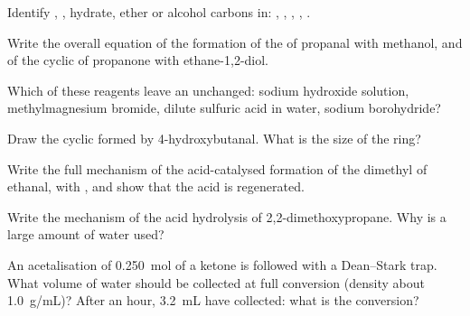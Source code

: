 \begin{exercise}[$\star$]\label{exo:b1:acetals-protection:1}
Identify , , hydrate, ether or alcohol carbons in:
, , , ,
.
\end{exercise}

\begin{exercise}[$\star$]\label{exo:b1:acetals-protection:2}
Write the overall equation of the formation of the  of propanal with
methanol, and of the cyclic  of propanone with ethane-1,2-diol.
\end{exercise}

\begin{exercise}[$\star$]\label{exo:b1:acetals-protection:3}
Which of these reagents leave an  unchanged: sodium hydroxide
solution, methylmagnesium bromide, dilute sulfuric acid in water, sodium
borohydride?
\end{exercise}

\begin{exercise}[$\star$]\label{exo:b1:acetals-protection:4}
Draw the cyclic  formed by 4-hydroxybutanal. What is the size
of the ring?
\end{exercise}

\begin{exercise}[$\star\star$]\label{exo:b1:acetals-protection:5}
Write the full mechanism of the acid-catalysed formation of the dimethyl
 of ethanal, with , and show that the acid is
regenerated.
\end{exercise}

\begin{exercise}[$\star\star$]\label{exo:b1:acetals-protection:6}
Write the mechanism of the acid hydrolysis of
2,2-dimethoxypropane. Why is a large amount of water used?
\end{exercise}

\begin{exercise}[$\star\star$]\label{exo:b1:acetals-protection:7}
An acetalisation of \qty{0.250}{mol} of a ketone is followed with a
Dean--Stark trap. What volume of water should be collected at full
conversion (density about \qty{1.0}{g/mL})? After an hour,
\qty{3.2}{mL} have collected: what is the conversion?
\end{exercise}

